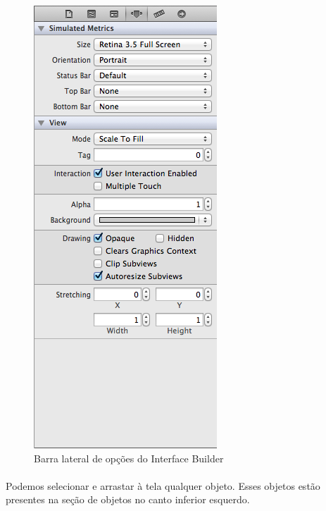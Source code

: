 \documentclass[a4paper,12pt,brazil,doubleside]{book}
\begin{document}
\begin{figure}[h]
  \centering
  \includegraphics[totalheight=0.2\textheight]{../figuras/ios/1/xib_opcoes.png}
  \caption{Barra lateral de opções do Interface Builder}
  \label{fig:a}
\end{figure}

\bigskip

\paragraph{}Podemos selecionar e arrastar à tela qualquer objeto. Esses objetos estão presentes na seção de objetos no canto inferior esquerdo.
\end{document}
